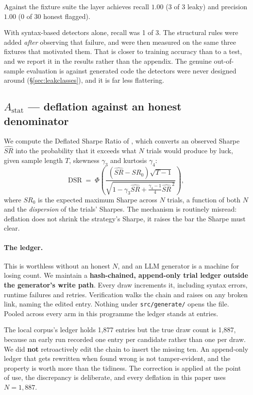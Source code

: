 \documentclass[11pt,a4paper]{article}
\begin{document}
Against the fixture suite the layer achieves recall $1.00$ (3 of 3 leaky) and precision $1.00$
(0 of 30 honest flagged).

\begin{selfreport}[title={This 100\% should be discounted, and here is why}]
With syntax-based detectors alone, recall was 1 of 3. The structural rules were added
\emph{after} observing that failure, and were then measured on the same three fixtures that
motivated them. That is closer to training accuracy than to a test, and we report it in the
results rather than the appendix. The genuine out-of-sample evaluation is against generated code
the detectors were never designed around (\S\ref{sec:leakclasses}), and it is far less flattering.
\end{selfreport}

\subsection{$A_{\mathrm{stat}}$ --- deflation against an honest denominator}

We compute the Deflated Sharpe Ratio of \citet{bailey2014}, which converts an observed Sharpe
$\widehat{SR}$ into the probability that it exceeds what $N$ trials would produce by luck, given
sample length $T$, skewness $\gamma_3$ and kurtosis $\gamma_4$:
\[
\mathrm{DSR} \;=\; \Phi\!\left(
\frac{(\widehat{SR} - SR_0)\sqrt{T-1}}
     {\sqrt{1 - \gamma_3 \widehat{SR} + \frac{\gamma_4 - 1}{4}\widehat{SR}^{\,2}}}
\right),
\]
where $SR_0$ is the expected maximum Sharpe across $N$ trials, a function of both $N$ and the
\emph{dispersion} of the trials' Sharpes. The mechanism is routinely misread: deflation does not
shrink the strategy's Sharpe, it raises the bar the Sharpe must clear.

\paragraph{The ledger.} This is worthless without an honest $N$, and an LLM generator is a machine
for losing count. We maintain a \textbf{hash-chained, append-only trial ledger outside the
generator's write path}. Every draw increments it, including syntax errors, runtime failures and
retries. Verification walks the chain and raises on any broken link, naming the edited entry.
Nothing under \texttt{src/generate/} opens the file. Pooled across every arm in this programme the
ledger stands at \pgmPooledTrials{} entries.

\begin{selfreport}[title={One deliberate imperfection in the ledger},
  label={sec:selfreport-ledger}]
The local corpus's ledger holds 1{,}877 entries but the true draw count is 1{,}887, because an
early run recorded one entry per candidate rather than one per draw. We did \textbf{not}
retroactively edit the chain to insert the missing ten. An append-only ledger that gets rewritten
when found wrong is not tamper-evident, and the property is worth more than the tidiness. The
correction is applied at the point of use, the discrepancy is deliberate, and every deflation in
this paper uses $N=1{,}887$.
\end{selfreport}
\end{document}
